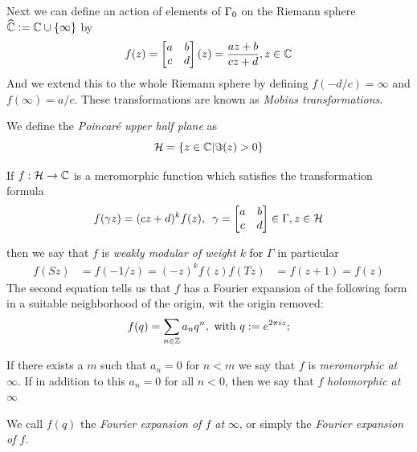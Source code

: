 Next we can define an action of elements of $\Gamma_0$ on the Riemann sphere 
$\widehat{\mathbb C}:= \mathbb C\cup\{\infty\}$ by 
\[f(z) = \begin{bmatrix}
    a & b \\
    c & d
\end{bmatrix}(z) = \frac{az+b}{cz+d}, z\in \mathbb C\]
And we extend this to the whole Riemann sphere by defining $f(-d/c) = \infty$ 
and $f(\infty) = a/c$. These transformations are known as 
\textit{Mobius transformations}.


We define the \textit{Poincaré upper half plane} as 
\[\mathcal{H} = \left\{z\in \mathbb C |\Im(z)>0\right\} \]

\mb 

If $f:\mathcal{H} \rightarrow{} \mathbb C$ is a meromorphic function which satisfies the transformation
formula 
\[f(\gamma z) = (cz+d)^kf(z), \,\,\, \gamma = 
\begin{bmatrix}
    a & b \\
    c & d
\end{bmatrix}\in \Gamma, z\in\mathcal{H}\]

then we say that $f$ is \textit{weakly modular of weight $k$} for $\Gamma$ in 
particular 
\begin{eqnarray*}
    f(Sz) &= f(-1/z) = (-z)^kf(z)
    f(Tz) &= f(z+1) = f(z)
\end{eqnarray*}
The second equation tells us that $f$ has a Fourier expansion of the following form in a suitable neighborhood
of the origin, wit the origin removed:
\[f(q) = \sum_{n\in \mathbb Z}a_nq^n, \text{ with } q:= e^{2\pi i z};\]

If there exists a $m$ such that $a_n=0$ for $n<m$ we say that $f$ is \textit{meromorphic at} 
$\infty$. If in addition to this $a_n=0$ for all $n<0$, then we say that 
$f$ \textit{holomorphic at} $\infty$ 

We call $f(q)$ the \textit{Fourier expansion of $f$ at} $\infty$, or simply the  \textit{Fourier expansion of $f$.}


